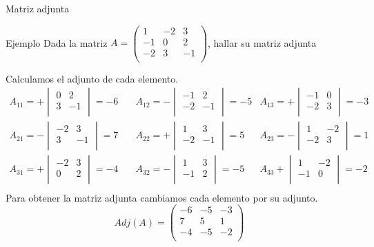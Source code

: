 \documentclass[9pt]{beamer}
\begin{document}
\begin{frame}{Matriz adjunta}
\begin{exampleblock}{Ejemplo}
Dada la matriz $A=\begin{pmatrix} 
 1& -2& 3 \\
 -1& 0& 2 \\
 -2& 3& -1 \\
\end{pmatrix}$, hallar su matriz adjunta
\end{exampleblock}
\pause
Calculamos el adjunto de cada elemento.
\pause
\[
\begin{aligned}
A_{11}= + \begin{vmatrix} 0& 2 \\ 3& -1 \\ \end{vmatrix} =   -6 \quad & 
A_{12}= - \begin{vmatrix} -1& 2 \\ -2& -1 \\ \end{vmatrix} =   -5 & 
A_{13}=  + \begin{vmatrix} -1& 0 \\ -2& 3 \\ \end{vmatrix} =   -3 \\
A_{21}= - \begin{vmatrix} -2& 3 \\ 3& -1 \\ \end{vmatrix} =   7 \quad &  
A_{22}= + \begin{vmatrix} 1& 3 \\ -2& -1 \\ \end{vmatrix} =   5 &  
A_{23}= - \begin{vmatrix} 1& -2 \\ -2& 3 \\ \end{vmatrix} =   1 \\
A_{31}= + \begin{vmatrix} -2& 3 \\ 0& 2 \\ \end{vmatrix} =   -4 \quad &
A_{32}=- \begin{vmatrix} 1& 3 \\ -1& 2 \\ \end{vmatrix} =   -5 &
A_{33} + \begin{vmatrix} 1& -2 \\ -1& 0 \\ \end{vmatrix} =   -2 \\
\end{aligned}
\]
\pause
Para obtener la matriz adjunta cambiamos cada elemento por su adjunto.
\pause
\[
Adj(A)=
\begin{pmatrix}
  -6 &  -5  &  -3 \\
  7 &  5&  1 \\
  -4&  -5&  -2 \\
\end{pmatrix}
\]
\end{frame}
\end{document}
